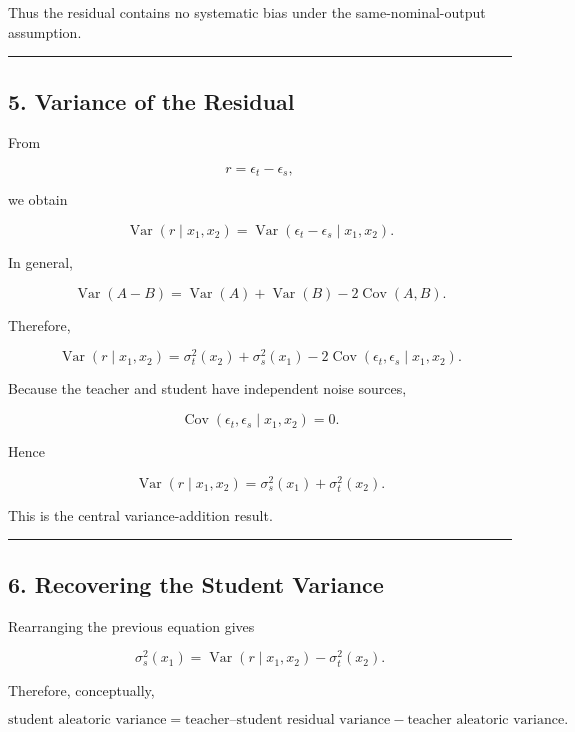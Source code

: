 Thus the residual contains no systematic bias under the
same-nominal-output assumption.

\begin{center}\rule{0.5\linewidth}{0.5pt}\end{center}

\subsection{5. Variance of the Residual}\label{variance-of-the-residual}

From

\[
r=\epsilon_t-\epsilon_s,
\]

we obtain

\[
\operatorname{Var}(r\mid x_1,x_2)
=
\operatorname{Var}(\epsilon_t-\epsilon_s\mid x_1,x_2).
\]

In general,

\[
\operatorname{Var}(A-B)
=
\operatorname{Var}(A)
+
\operatorname{Var}(B)
-
2\operatorname{Cov}(A,B).
\]

Therefore,

\[
\operatorname{Var}(r\mid x_1,x_2)
=
\sigma_t^2(x_2)
+
\sigma_s^2(x_1)
-
2\operatorname{Cov}(\epsilon_t,\epsilon_s\mid x_1,x_2).
\]

Because the teacher and student have independent noise sources,

\[
\operatorname{Cov}(\epsilon_t,\epsilon_s\mid x_1,x_2)=0.
\]

Hence

\[
\boxed{
\operatorname{Var}(r\mid x_1,x_2)
=
\sigma_s^2(x_1)+\sigma_t^2(x_2).
}
\]

This is the central variance-addition result.

\begin{center}\rule{0.5\linewidth}{0.5pt}\end{center}

\subsection{6. Recovering the Student
Variance}\label{recovering-the-student-variance}

Rearranging the previous equation gives

\[
\boxed{
\sigma_s^2(x_1)
=
\operatorname{Var}(r\mid x_1,x_2)
-
\sigma_t^2(x_2).
}
\]

Therefore, conceptually,

\[
\boxed{
\text{student aleatoric variance}
=
\text{teacher–student residual variance}
-
\text{teacher aleatoric variance}.
}
\]

